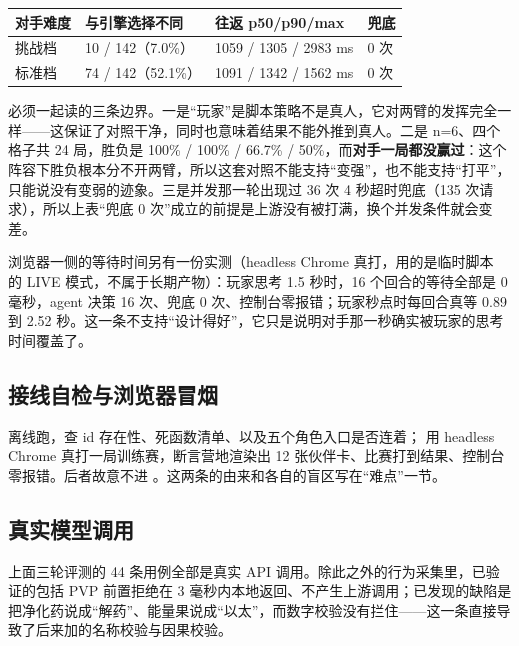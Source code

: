 \begin{table}[h]
\centering
\small
\begin{tabular}{L{2.6cm}L{3.2cm}L{4.0cm}L{1.0cm}}
\toprule
对手难度 & 与引擎选择不同 & 往返 p50/p90/max & 兜底 \\
\midrule
挑战档 & 10 / 142（7.0\%） & 1059 / 1305 / 2983 ms & 0 次 \\
标准档 & 74 / 142（52.1\%） & 1091 / 1342 / 1562 ms & 0 次 \\
\bottomrule
\end{tabular}
\end{table}

必须一起读的三条边界。一是“玩家”是脚本策略不是真人，它对两臂的发挥完全一样——这保证了对照干净，同时也意味着结果不能外推到真人。二是 n=6、四个格子共 24 局，胜负是 100\% / 100\% / 66.7\% / 50\%，而\textbf{对手一局都没赢过}：这个阵容下胜负根本分不开两臂，所以这套对照不能支持“变强”，也不能支持“打平”，只能说没有变弱的迹象。三是并发那一轮出现过 36 次 4 秒超时兜底（135 次请求），所以上表“兜底 0 次”成立的前提是上游没有被打满，换个并发条件就会变差。

浏览器一侧的等待时间另有一份实测（headless Chrome 真打，用的是临时脚本  的 LIVE 模式，不属于长期产物）：玩家思考 1.5 秒时，16 个回合的等待全部是 0 毫秒，agent 决策 16 次、兜底 0 次、控制台零报错；玩家秒点时每回合真等 0.89 到 2.52 秒。这一条不支持“设计得好”，它只是说明对手那一秒确实被玩家的思考时间覆盖了。

\subsection{接线自检与浏览器冒烟}

 离线跑，查 id 存在性、死函数清单、以及五个角色入口是否连着； 用 headless Chrome 真打一局训练赛，断言营地渲染出 12 张伙伴卡、比赛打到结果、控制台零报错。后者故意不进 。这两条的由来和各自的盲区写在“难点”一节。

\subsection{真实模型调用}

上面三轮评测的 44 条用例全部是真实 API 调用。除此之外的行为采集里，已验证的包括 PVP 前置拒绝在 3 毫秒内本地返回、不产生上游调用；已发现的缺陷是把净化药说成“解药”、能量果说成“以太”，而数字校验没有拦住——这一条直接导致了后来加的名称校验与因果校验。
